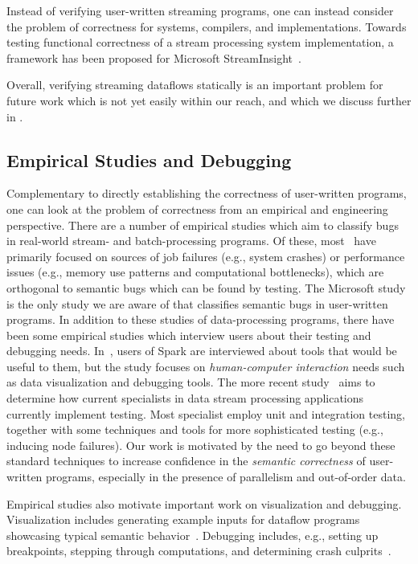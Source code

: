 Instead of verifying user-written streaming programs, one can instead consider the problem of correctness for systems, compilers, and implementations.
Towards testing functional correctness of a stream processing system implementation, a framework has been proposed for Microsoft StreamInsight~\cite{raizman2010extensible}.

Overall, verifying streaming dataflows statically is an important problem for future work which is not yet easily within our reach, and which we discuss further in .

\subsection{Empirical Studies and Debugging}

Complementary to directly establishing the correctness of user-written programs, one can look at the problem of correctness from an empirical and engineering perspective.
There are a number of empirical studies which aim to classify bugs in real-world stream- and batch-processing programs. Of these, most~\cite{schroeder2009large, kavulya2010analysis, li2013characteristic, zhou2015empirical} have primarily focused on sources of job failures (e.g., system crashes) or performance issues (e.g., memory use patterns and computational bottlenecks), which are orthogonal to semantic bugs which can be found by testing. The Microsoft study~\cite{xiao2014nondeterminism} is the only study we are aware of that classifies semantic bugs in user-written programs.
In addition to these studies of data-processing programs, there have been some empirical studies which interview users about their testing and debugging needs. In~\cite{fisher2012interactions}, users of Spark are interviewed about tools that would be useful to them, but the study focuses on \emph{human-computer interaction} needs such as data visualization and debugging tools. The more recent study~\cite{vianna2019exploratory} aims to determine how current specialists in data stream processing applications currently implement testing. Most specialist employ unit and integration testing, together with some techniques and tools for more sophisticated testing (e.g., inducing node failures). Our work is motivated by the need to go beyond these standard techniques to increase confidence in the \emph{semantic correctness} of user-written programs, especially in the presence of parallelism and out-of-order data.

Empirical studies also motivate important work on visualization and debugging.
Visualization includes generating example inputs for dataflow programs showcasing typical semantic behavior~\cite{olston2009generating}. Debugging includes, e.g., setting up breakpoints, stepping through computations, and determining crash culprits~\cite{gulzar2016bigdebug,olston2011inspector}.

